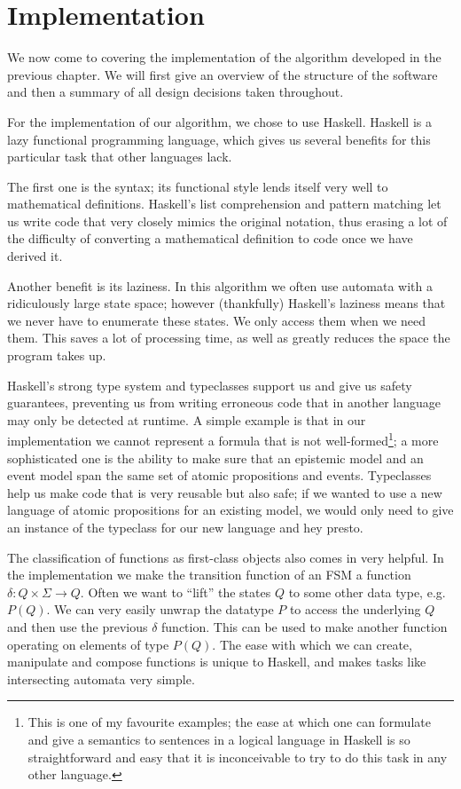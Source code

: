 \documentclass[ %
                    author={Leo Poulson},
                supervisor={Dr. Steven Ramsay},
                    degree={BSc},
                     title={Epistemic Planning for the Dynamic Gossip problem},
                  subtitle={},
                      year={2019} ]{dissertation}
\begin{document}
\newpage 

\chapter{Implementation}

We now come to covering the implementation of the algorithm developed in the
previous chapter. We will first give an overview of the structure of the
software and then a summary of all design decisions taken throughout. 

For the implementation of our algorithm, we chose to use Haskell. Haskell is a
lazy functional programming language, which gives us several benefits for this
particular task that other languages lack. 

The first one is the syntax; its functional style lends itself very well to
mathematical definitions. Haskell's list comprehension and pattern matching let us
write code that very closely mimics the original notation, thus erasing a lot of
the difficulty of converting a mathematical definition to code once we have
derived it. 

Another benefit is its laziness. In this algorithm we often use automata
with a ridiculously large state space; however (thankfully) Haskell's laziness
means that we never have to enumerate these states. We only access them when we
need them. This saves a lot of processing time, as well as greatly reduces the
space the program takes up.

Haskell's strong type system and typeclasses support us and give us safety
guarantees, preventing us from writing erroneous code that in another language
may only be detected at runtime. A simple example is that in our implementation
we cannot represent a formula that is not well-formed\footnote{This is one of my
  favourite examples; the ease at which one can formulate and give a semantics
  to sentences in a logical language in Haskell is so straightforward and easy
  that it is inconceivable to try to do this task in any other language.}; a more
sophisticated one is the ability to make sure that an epistemic model and an
event model span the same set of atomic propositions and events. Typeclasses
help us make code that is very reusable but also safe; if we wanted to use a new
language of atomic propositions for an existing model, we would only need to
give an instance of the  typeclass for our new language and hey
presto.

The classification of functions as first-class objects also comes in very
helpful. In the implementation we make the transition function of an FSM a
function $\delta : Q \times \Sigma \rightarrow Q$. Often we want to ``lift'' the
states $Q$ to some other data type, e.g. $P (Q)$. We can very easily unwrap the
datatype $P$ to access the underlying $Q$ and then use the previous $\delta$
function. This can be used to make another function operating on elements of
type $P (Q)$. The ease with which we can create, manipulate and compose
functions is unique to Haskell, and makes tasks like intersecting automata very
simple. 
\end{document}
